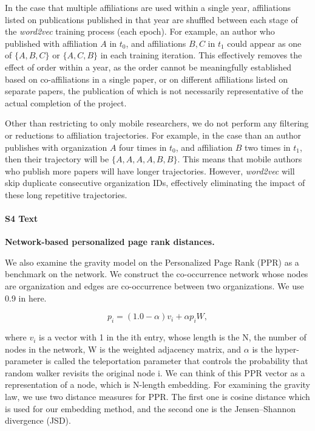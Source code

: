 \documentclass[12pt]{article} %
\begin{document}
In the case that multiple affiliations are used within a single year, affiliations listed on publications published in that year are shuffled between each stage of the \textit{word2vec} training process (each epoch).
For example, an author who published with affiliation $A$ in $t_{0}$, and affiliations $B, C$ in $t_{1}$ could appear as one of $\{A, B, C\}$ or $\{A, C, B\}$ in each training iteration.
This effectively removes the effect of order within a year, as the order cannot be meaningfully established based on co-affiliations in a single paper, or on different affiliations listed on separate papers, the publication of which is not necessarily representative of the actual completion of the project.

Other than restricting to only mobile researchers, we do not perform any filtering or reductions to affiliation trajectories.
For example, in the case than an author publishes with organization $A$ four times in $t_{0}$, and affiliation $B$ two times in $t_{1}$, then their trajectory will be $\{A, A, A, A, B, B\}$.
This means that mobile authors who publish more papers will have longer trajectories.
However, \textit{word2vec} will skip duplicate consecutive organization IDs, effectively eliminating the impact of these long repetitive trajectories.




%
\paragraph*{S4 Text}
\label{si:text:ppr_dist}
{\bf Network-based personalized page rank distances.}


We also examine the gravity model on the Personalized Page Rank (PPR)\autocite{jeh2003scaling} as a benchmark on the network. We construct the co-occurrence network whose nodes are organization and edges are co-occurrence between two organizations. We use 0.9 in here.

\begin{equation}
	\label{eq:ppr}
	p_i = (1.0 - \alpha) v_i + \alpha p_i W,
\end{equation}

where $v_i$ is a vector with 1 in the ith entry, whose length is the N, the number of nodes in the network, W is the weighted adjacency matrix, and $\alpha$ is the hyper-parameter is called the teleportation parameter that controls the probability that random walker revisits the original node i. We can think of this PPR vector as a representation of a node, which is N-length embedding. For examining the gravity law, we use two distance measures for PPR. The first one is cosine distance which is used for our embedding method, and the second one is the Jensen–Shannon divergence (JSD).
\end{document}
